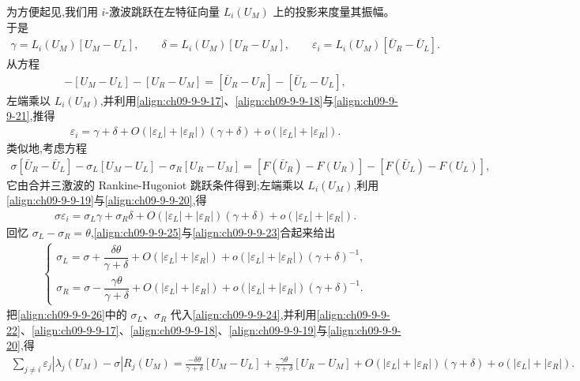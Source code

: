 \documentclass[../../main.tex]{subfiles}
\begin{document}
为方便起见,我们用 $i$-激波跳跃在左特征向量 $L_{i}(U_{M})$ 上的投影来度量其振幅。于是
\begin{align}
\gamma=L_{i}(U_{M})[U_{M}-U_{L}],\qquad\delta=L_{i}(U_{M})[U_{R}-U_{M}],\qquad\varepsilon_{i}=L_{i}(U_{M})[\bar{U}_{R}-\bar{U}_{L}].
\label{align:ch09-9-9-21}
\end{align}
从方程
\begin{align}
[\bar{U}_{R}-\bar{U}_{L}]-[U_{M}-U_{L}]-[U_{R}-U_{M}]=[\bar{U}_{R}-U_{R}]-[\bar{U}_{L}-U_{L}],
\label{align:ch09-9-9-22}
\end{align}
左端乘以 $L_{i}(U_{M})$,并利用\eqref{align:ch09-9-9-17}、\eqref{align:ch09-9-9-18}与\eqref{align:ch09-9-9-21},推得
\begin{align}
\varepsilon_{i}=\gamma+\delta+O(|\varepsilon_{L}|+|\varepsilon_{R}|)(\gamma+\delta)+o(|\varepsilon_{L}|+|\varepsilon_{R}|).
\label{align:ch09-9-9-23}
\end{align}
类似地,考虑方程
\begin{align}
\sigma[\bar{U}_{R}-\bar{U}_{L}]-\sigma_{L}[U_{M}-U_{L}]-\sigma_{R}[U_{R}-U_{M}]=[F(\bar{U}_{R})-F(U_{R})]-[F(\bar{U}_{L})-F(U_{L})],
\label{align:ch09-9-9-24}
\end{align}
它由合并三激波的 Rankine-Hugoniot 跳跃条件得到;左端乘以 $L_{i}(U_{M})$,利用\eqref{align:ch09-9-9-19}与\eqref{align:ch09-9-9-20},得
\begin{align}
\sigma\varepsilon_{i}=\sigma_{L}\gamma+\sigma_{R}\delta+O(|\varepsilon_{L}|+|\varepsilon_{R}|)(\gamma+\delta)+o(|\varepsilon_{L}|+|\varepsilon_{R}|).
\label{align:ch09-9-9-25}
\end{align}
回忆 $\sigma_{L}-\sigma_{R}=\theta$,\eqref{align:ch09-9-9-25}与\eqref{align:ch09-9-9-23}合起来给出
\begin{align}
\begin{cases}
\sigma_{L}=\sigma+\dfrac{\delta\theta}{\gamma+\delta}+O(|\varepsilon_{L}|+|\varepsilon_{R}|)+o(|\varepsilon_{L}|+|\varepsilon_{R}|)(\gamma+\delta)^{-1},\\[3mm]
\sigma_{R}=\sigma-\dfrac{\gamma\theta}{\gamma+\delta}+O(|\varepsilon_{L}|+|\varepsilon_{R}|)+o(|\varepsilon_{L}|+|\varepsilon_{R}|)(\gamma+\delta)^{-1}.
\end{cases}
\label{align:ch09-9-9-26}
\end{align}
把\eqref{align:ch09-9-9-26}中的 $\sigma_{L}$、$\sigma_{R}$ 代入\eqref{align:ch09-9-9-24},并利用\eqref{align:ch09-9-9-22}、\eqref{align:ch09-9-9-17}、\eqref{align:ch09-9-9-18}、\eqref{align:ch09-9-9-19}与\eqref{align:ch09-9-9-20},得
\begin{align}
\sum_{j\neq i}\varepsilon_{j}|\lambda_{j}(U_{M})-\sigma|R_{j}(U_{M})
=\frac{-\delta\theta}{\gamma+\delta}[U_{M}-U_{L}]+\frac{\gamma\theta}{\gamma+\delta}[U_{R}-U_{M}]
+O(|\varepsilon_{L}|+|\varepsilon_{R}|)(\gamma+\delta)+o(|\varepsilon_{L}|+|\varepsilon_{R}|).
\label{align:ch09-9-9-27}
\end{align}
\end{document}
